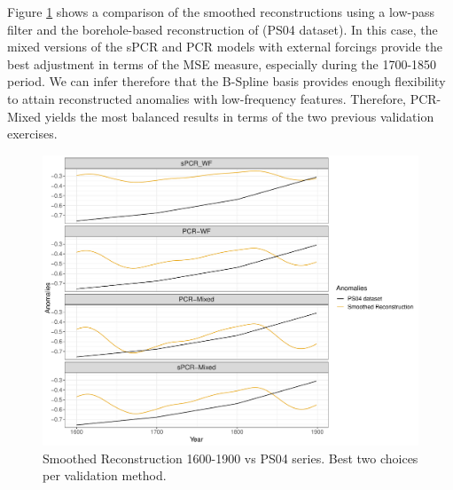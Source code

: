 \documentclass[12pt]{amsart}
\theoremstyle{plain}
\theoremstyle{definition}
\theoremstyle{remark}
\begin{document}
Figure \ref{fig:paleo15001} shows a comparison of the smoothed reconstructions
using a low-pass filter and the borehole-based reconstruction of
\cite{Pollack2004} (PS04 dataset). In this case, the mixed versions of the sPCR
and PCR models with external forcings provide the best adjustment in terms of
the MSE measure, especially during the 1700-1850 period. We can infer therefore
that the B-Spline basis provides enough flexibility to attain reconstructed
anomalies with low-frequency features. Therefore, PCR-Mixed yields the most balanced
results in terms of the two previous validation exercises.

\begin{figure}[h!]
  \centering
  \includegraphics[scale=0.40]{Rec1500_Final}
  \caption{Smoothed Reconstruction 1600-1900 vs PS04 series. Best two choices per validation method.}
  \label{fig:paleo15001}
\end{figure}
\end{document}
